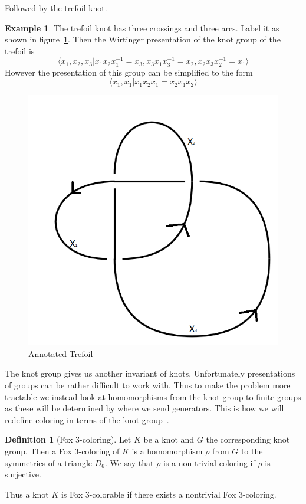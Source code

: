 \documentclass[12pt]{amsart}
\theoremstyle{definition}
\newtheorem{definition}[theorem]{Definition}
\newtheorem{example}[theorem]{Example}
\theoremstyle{remark}
\numberwithin{equation}{section}
\newcommand{\ds}{.3}
\begin{document}
Followed by the trefoil knot.

\begin{example}
  The trefoil knot has three crossings and three arcs. Label it as
  shown in figure~\ref{fig:annotated-trefoil}. Then the Wirtinger presentation
  of the knot group of the trefoil is
  \[
    \langle x_1,x_2,x_3|x_1x_2x_1^{-1}=x_3,x_3x_1x_3^{-1}=x_2,x_2x_3x_2^{-1}=x_1\rangle
  \]
  However the presentation of this group can be simplified to the
  form
  \[
    \langle x_1,x_1| x_1x_2x_1=x_2x_1x_2\rangle
  \]
\end{example}

\begin{figure}
  \includegraphics[scale=\ds]{annotated-trefoil}
  \caption{Annotated Trefoil}
  \label{fig:annotated-trefoil}
\end{figure}

The knot group gives us another invariant of knots. Unfortunately
presentations of groups can be rather difficult to work with.
Thus to make the problem more tractable we instead look
at homomorphisms from the knot group to finite groups as these
will be determined by where we send generators. This is
how we will redefine coloring in terms of the knot group~\cite{quickfox}.

\begin{definition}[Fox 3-coloring]
  Let $K$ be a knot and $G$ the corresponding knot group. Then a
  Fox 3-coloring of $K$ is a homomorphism $\rho$ from
  $G$ to the symmetries of a triangle $D_6$. We say that
  $\rho$ is a non-trivial coloring if $\rho$ is surjective.

  Thus a knot $K$ is Fox 3-colorable if there exists a nontrivial
  Fox 3-coloring.
\end{definition}
\end{document}
